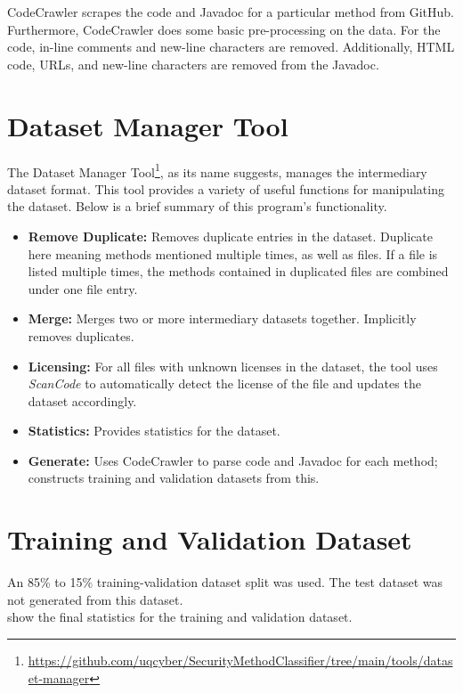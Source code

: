 \noindent
CodeCrawler scrapes the code and Javadoc for a particular method from GitHub. Furthermore, CodeCrawler does some basic pre-processing on the data. For the code, in-line comments and new-line characters are removed. Additionally, HTML code, URLs, and new-line characters are removed from the Javadoc. 

\section{Dataset Manager Tool}

\noindent
The Dataset Manager Tool\footnote{\url{https://github.com/uqcyber/SecurityMethodClassifier/tree/main/tools/dataset-manager}}, as its name suggests, manages the intermediary dataset format. This tool provides a variety of useful functions for manipulating the dataset. Below is a brief summary of this program's functionality.

\begin{itemize}
    \item \textbf{Remove Duplicate:} Removes duplicate entries in the dataset. Duplicate here meaning methods mentioned multiple times, as well as files. If a file is listed multiple times, the methods contained in duplicated files are combined under one file entry.
    \item \textbf{Merge:} Merges two or more intermediary datasets together. Implicitly removes duplicates.
    \item \textbf{Licensing:} For all files with unknown licenses in the dataset, the tool uses \emph{ScanCode} to automatically detect the license of the file and updates the dataset accordingly.
    \item \textbf{Statistics:} Provides statistics for the dataset.
    \item \textbf{Generate:} Uses CodeCrawler to parse code and Javadoc for each method; constructs training and validation datasets from this.
\end{itemize}

\section{Training and Validation Dataset}

An 85\% to 15\% training-validation dataset split was used. The test dataset was not generated from this dataset. \\

\noindent
{} show the final statistics for the training and validation dataset.

